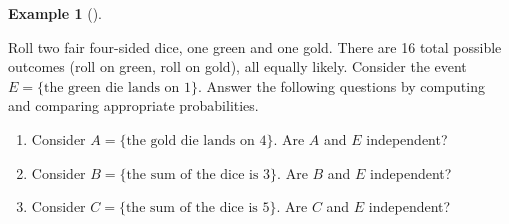 \documentclass[
  letterpaper,
  DIV=11,
  numbers=noendperiod]{scrreprt}
\providecommand{\tightlist}{%
  \setlength{\itemsep}{0pt}\setlength{\parskip}{0pt}}
\theoremstyle{plain}
\theoremstyle{definition}
\newtheorem{example}{Example}[chapter]
\theoremstyle{definition}
\theoremstyle{definition}
\theoremstyle{remark}
\begin{document}
\begin{tcolorbox}[enhanced jigsaw, opacityback=0, left=2mm, colframe=quarto-callout-note-color-frame, toprule=.15mm, breakable, colback=white, leftrule=.75mm, arc=.35mm, rightrule=.15mm, bottomrule=.15mm]

\begin{example}[]\protect\hypertarget{exm-dice-independent}{}\label{exm-dice-independent}

Roll two fair four-sided dice, one green and one gold. There are 16
total possible outcomes (roll on green, roll on gold), all equally
likely. Consider the event \(E=\{\text{the green die lands on 1}\}\).
Answer the following questions by computing and comparing appropriate
probabilities.

\begin{enumerate}
\def\labelenumi{\arabic{enumi}.}
\tightlist
\item
  Consider \(A=\{\text{the gold die lands on 4}\}\). Are \(A\) and \(E\)
  independent?
\item
  Consider \(B=\{\text{the sum of the dice is 3}\}\). Are \(B\) and
  \(E\) independent?
\item
  Consider \(C=\{\text{the sum of the dice is 5}\}\). Are \(C\) and
  \(E\) independent?
\end{enumerate}

\end{example}

\end{tcolorbox}
\end{document}
